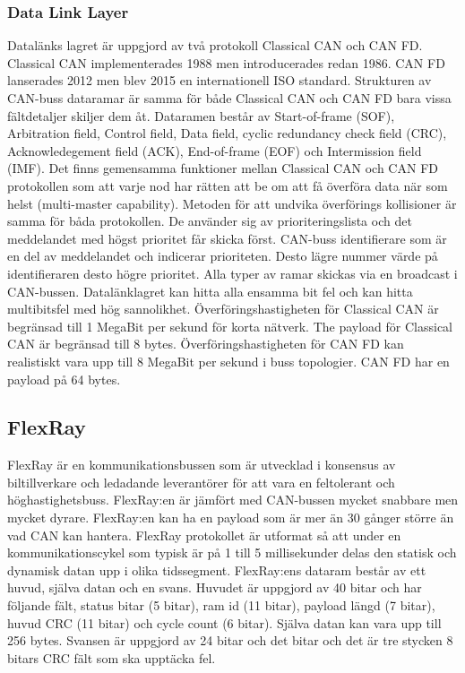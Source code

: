 \documentclass[a4paper]{IEEEtran}
\begin{document}
\subsubsection{Data Link Layer}
Datalänks lagret är uppgjord av två protokoll Classical CAN och CAN FD. Classical CAN implementerades 1988 men introducerades redan 1986. CAN FD lanserades 2012 men blev 2015 en internationell ISO standard. Strukturen av CAN-buss dataramar är samma för både Classical CAN och CAN FD bara vissa fältdetaljer skiljer dem åt. Dataramen består av Start-of-frame (SOF), Arbitration field, Control field, Data field, cyclic redundancy check field (CRC), Acknowledegement field (ACK), End-of-frame (EOF) och Intermission field (IMF). Det finns gemensamma funktioner mellan Classical CAN och CAN FD protokollen som att varje nod har rätten att be om att få överföra data när som helst (multi-master capability). Metoden för att undvika överförings kollisioner är samma för båda protokollen. De använder sig av prioriteringslista och det meddelandet med högst prioritet får skicka först. CAN-buss identifierare som är en del av meddelandet och indicerar prioriteten. Desto lägre nummer värde på identifieraren desto högre prioritet. Alla typer av ramar skickas via en broadcast i CAN-bussen. Datalänklagret kan hitta alla ensamma bit fel och kan hitta multibitsfel med hög sannolikhet. Överföringshastigheten för Classical CAN är begränsad till 1 MegaBit per sekund för korta nätverk. The payload för Classical CAN är begränsad till 8 bytes. Överföringshastigheten för CAN FD kan realistiskt vara upp till 8 MegaBit per sekund i buss topologier. CAN FD har en payload på 64 bytes. \cite{CANdata}

\subsection{FlexRay} \label{sec:FlexRay}
FlexRay är en kommunikationsbussen som är utvecklad i konsensus av biltillverkare och ledadande leverantörer för att vara en feltolerant och höghastighetsbuss. FlexRay:en är jämfört med CAN-bussen mycket snabbare men mycket dyrare. FlexRay:en kan ha en payload som är mer än 30 gånger större än vad CAN kan hantera. FlexRay protokollet är utformat så att under en kommunikationscykel som typisk är på 1 till 5 millisekunder delas den statisk och dynamisk datan upp i olika tidssegment. FlexRay:ens dataram består av ett huvud, själva datan och en svans. Huvudet är uppgjord av 40 bitar och har följande fält, status bitar (5 bitar), ram id (11 bitar), payload längd (7 bitar), huvud CRC (11 bitar) och cycle count (6 bitar). Själva datan kan vara upp till 256 bytes. Svansen är uppgjord av 24 bitar och det bitar och det är tre stycken 8 bitars CRC fält som ska upptäcka fel. \cite{FlexRayOverview}
\end{document}
